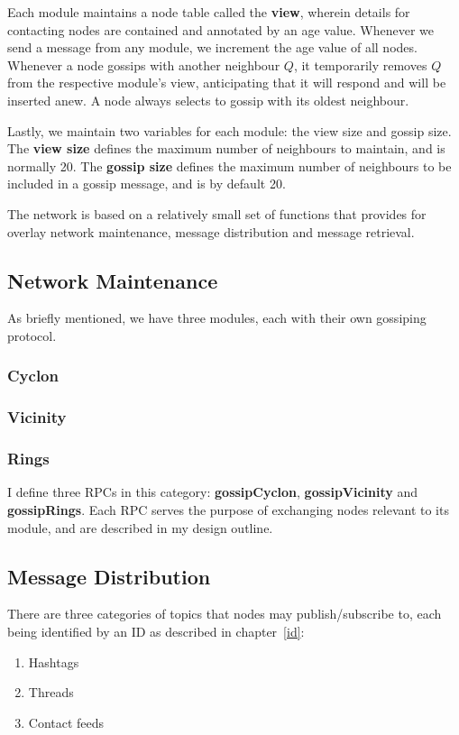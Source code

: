 \documentclass[10pt,a4paper,onecolumn]{article}
\begin{document}
Each module maintains a node table called the \textbf{view}, wherein details for contacting nodes are contained and annotated by an age value. Whenever we send a message from any module, we increment the age value of all nodes. Whenever a node gossips with another  neighbour $Q$, it temporarily removes $Q$ from the respective module’s view, anticipating that it will respond and will be inserted anew. A node always selects to gossip with its oldest neighbour.

Lastly, we maintain two variables for each module: the view size and gossip size. The \textbf{view size} defines the maximum number of neighbours to maintain, and is normally 20. The \textbf{gossip size} defines the maximum number of neighbours to be included in a gossip message, and is by default 20.

The network is based on a relatively small set of functions that provides for overlay network maintenance, message distribution and message retrieval.

\subsection*{Network Maintenance}
As briefly mentioned, we have three modules, each with their own gossiping protocol. 

\subsubsection*{Cyclon}
\subsubsection*{Vicinity}
\subsubsection*{Rings}

I define three RPCs in this category: \textbf{gossipCyclon}, \textbf{gossipVicinity} and \textbf{gossipRings}. Each RPC serves the purpose of exchanging nodes relevant to its module, and are described in my design outline.

\subsection*{Message Distribution}
There are three categories of topics that nodes may publish/subscribe to, each being identified by an ID as described in chapter~\ref{id}:
\begin{enumerate}
\item Hashtags
\item Threads
\item Contact feeds
\end{enumerate}
\end{document}

